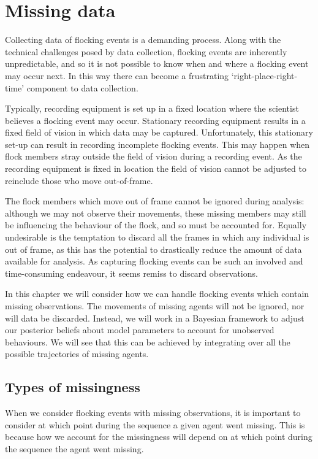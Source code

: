 \graphicspath{{fig/missing/}}

\chapter{Missing data}
\label{cha:missing}

Collecting data of flocking events is a demanding process. Along with the
technical challenges posed by data collection, flocking events are inherently
unpredictable, and so it is not possible to know when and where a flocking
event may occur next. In this way there can become a frustrating
`right-place-right-time' component to data collection.

Typically, recording equipment is set up in a fixed location where the
scientist believes a flocking event may occur. Stationary recording equipment
results in a fixed field of vision in which data may be captured.
Unfortunately, this stationary set-up can result in recording incomplete
flocking events. This may happen when flock members stray outside the field of
vision during a recording event. As the recording equipment is fixed in
location the field of vision cannot be adjusted to reinclude those who move
out-of-frame.

The flock members which move out of frame cannot be ignored during analysis:
although we may not observe their movements, these missing members may still be
influencing the behaviour of the flock, and so must be accounted for. Equally
undesirable is the temptation to discard all the frames in which any individual
is out of frame, as this has the potential to drastically reduce the amount of
data available for analysis. As capturing flocking events can be such an
involved and time-consuming endeavour, it seems remiss to discard observations.

In this chapter we will consider how we can handle flocking events which
contain missing observations. The movements of missing agents will not be
ignored, nor will data be discarded. Instead, we will work in a Bayesian framework
to adjust our posterior beliefs about model parameters to account for
unobserved behaviours. We will see that this can be achieved by integrating
over all the possible trajectories of missing agents.

\section{Types of missingness}

When we consider flocking events with missing observations, it is important to
consider at which point during the sequence a given agent went missing. This is
because how we account for the missingness will depend on at which point during
the sequence the agent went missing.

